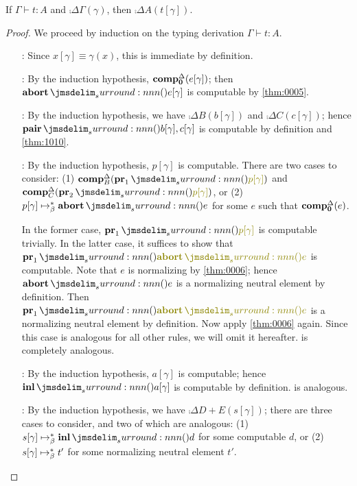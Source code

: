 \documentclass[a4paper]{article}
\begin{document}
\begin{theorem}[\cref{ax:0001}]\label{thm:0302}
  If $\Gamma \vdash t : A$ and $\comp{\Delta}{\Gamma}(\gamma)$, then $\comp{\Delta}{A}(t[\gamma])$.
\end{theorem}
\begin{proof}
  We proceed by induction on the typing derivation $\Gamma \vdash t : A$.
  \begin{itemize}
  \item[\rVar:] Since $x[\gamma] \equiv \gamma(x)$, this is immediate by definition.
  \item[\rEmpE:] By the induction hypothesis, $\operatorname{\mathbf{comp}}^{\Delta}_{\mathbf{0}}(e[\gamma])$; then $\tmAbort{e[\gamma]}$ is computable by \cref{thm:0005}.
  \item[\rProdI:] By the induction hypothesis, we have $\comp{\Delta}{B}(b[\gamma])$ and $\comp{\Delta}{C}(c[\gamma])$; hence $\tmPair{b[\gamma]}{c[\gamma]}$ is computable by definition and \cref{thm:1010}.
  \item[\rProdEl:] By the induction hypothesis, $p[\gamma]$ is computable.
    There are two cases to consider: (1) $\comp{\Delta}{B}(\tmPrl{p[\gamma]})$ and $\comp{\Delta}{C}(\tmPrr{p[\gamma]})$, or (2) $p[\gamma] \bRed* \tmAbort{e}$ for some $e$ such that $\operatorname{\mathbf{comp}}^{\Delta}_{\mathbf{0}}(e)$.

    In the former case, $\tmPrl{p[\gamma]}$ is computable trivially.
    In the latter case, it suffices to show that $\tmPrl{\tmAbort{e}}$ is computable.
    Note that $e$ is normalizing by \cref{thm:0006}; hence $\tmAbort{e}$ is a normalizing neutral element by definition.
    Then $\tmPrl{\tmAbort{e}}$ is a normalizing neutral element by definition.
    Now apply \cref{thm:0006} again.
    Since this case is analogous for all other rules, we will omit it hereafter.
    \rProdEr{} is completely analogous.
  \item[\rSumIl:] By the induction hypothesis, $a[\gamma]$ is computable; hence $\tmInl{a[\gamma]}$ is computable by definition.
    \rSumIr{} is analogous.
  \item[\rSumE:] By the induction hypothesis, we have $\comp{\Delta}{D + E}(s[\gamma])$; there are three cases to consider, and two of which are analogous: (1) $s[\gamma] \bRed* \tmInl{d}$ for some computable $d$, or (2) $s[\gamma] \bRed* t'$ for some normalizing neutral element $t'$.


\end{itemize}
\end{proof}
\end{document}
